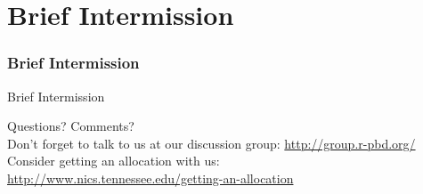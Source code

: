 \section[Break]{Brief Intermission}
\hidenum
\begin{frame}[noframenumbering]
\frametitle{Brief Intermission}
  \begin{block}{Brief Intermission}
  \begin{center}
     {\Large Questions?  Comments?}\\[.6cm]
     Don't forget to talk to us at our discussion group: \url{http://group.r-pbd.org/}\\[.6cm]
     Consider getting an allocation with us:  \\
     \url{http://www.nics.tennessee.edu/getting-an-allocation}
  \end{center}
  \end{block}
\end{frame}
\shownum

